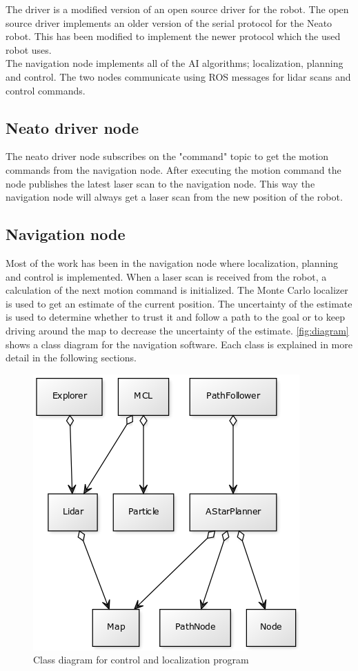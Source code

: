 The driver is a modified version of an open source driver for the robot.  The open source driver implements an older version of the serial protocol for the Neato robot. This has been modified to implement the newer protocol which the used robot uses.\\

The navigation node implements all of the AI algorithms; localization, planning and control. The two nodes communicate using ROS messages for lidar scans and control commands. 

\subsection{Neato driver node}
The neato driver node subscribes on the "command" topic to get the motion commands from the navigation node. After executing the motion command the node publishes the latest laser scan to the navigation node. This way the navigation node will always get a laser scan from the new position of the robot.

\subsection{Navigation node}
Most of the work has been in the navigation node where localization, planning and control is implemented. When a laser scan is received from the robot, a calculation of the next motion command is initialized. The Monte Carlo localizer is used to get an estimate of the current position. The uncertainty of the estimate is used to determine whether to trust it and follow a path to the goal or to keep driving around the map to decrease the uncertainty of the estimate. \autoref{fig:diagram} shows a class diagram for the navigation software. Each class is explained in more detail in the following sections.

\begin{figure}[H]
\centering
\includegraphics[scale=0.40]{images/diagram}
\caption{Class diagram for control and localization program}
\label{fig:diagram}
\end{figure}

